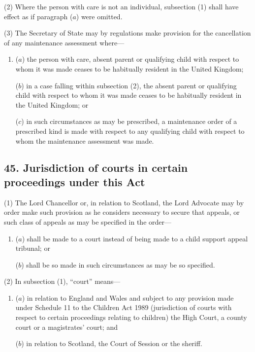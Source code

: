 \documentclass[12pt,a4paper]{article}
\begin{document}
(2) Where the person with care is not an individual, subsection (1)  shall have effect as if paragraph ($a$)  were omitted.

(3) The Secretary of State may by regulations make provision for the cancellation of any maintenance assessment where—
\begin{enumerate}\item[]
($a$) the person with care, absent parent or qualifying child with respect to whom it was made ceases to be habitually resident in the United Kingdom;

($b$) in a case falling within subsection (2), the absent parent or qualifying child with respect to whom it was made ceases to be habitually resident in the United Kingdom; or

($c$) in such circumstances as may be prescribed, a maintenance order of a prescribed kind is made with respect to any qualifying child with respect to whom the maintenance assessment was made.
\end{enumerate}


\subsection{45. Jurisdiction of courts in certain proceedings under this Act}

(1) The Lord Chancellor or, in relation to Scotland, the Lord Advocate may by order make such provision as he considers necessary to secure that appeals, or such class of appeals as may be specified in the order—
\begin{enumerate}\item[]
($a$) shall be made to a court instead of being made to a child support appeal tribunal; or

($b$) shall be so made in such circumstances as may be so specified.
\end{enumerate}

(2) In subsection (1), “court” means—
\begin{enumerate}\item[]
($a$) in relation to England and Wales and subject to any provision made under Schedule 11 to the Children Act 1989 (jurisdiction of courts with respect to certain proceedings relating to children) the High Court, a county court or a magistrates' court; and

($b$) in relation to Scotland, the Court of Session or the sheriff.
\end{enumerate}
\end{document}
